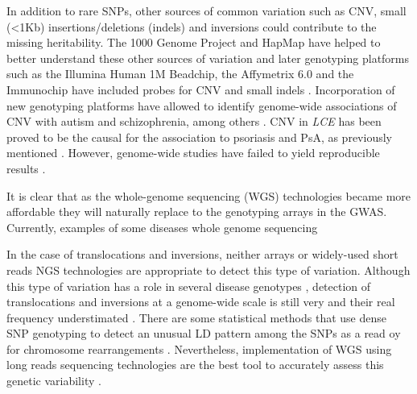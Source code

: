 In addition to rare SNPs, other sources of common variation such as CNV, small (<1Kb) insertions/deletions (indels) and inversions could contribute to the missing heritability. The 1000 Genome Project and HapMap have helped to better understand these other sources of variation and later genotyping platforms such as the Illumina Human 1M Beadchip, the Affymetrix 6.0 and the Immunochip have included probes for CNV and small indels \parencite{Ku2010}. Incorporation of new genotyping platforms have allowed to identify genome-wide associations of CNV with autism and schizophrenia, among others \parencite{Glessner2009,Marshall2017}. CNV in \textit{LCE} has been proved to be the causal for the association to psoriasis and PsA, as previously mentioned \parencite{Cid2009}. However, genome-wide studies have failed to yield reproducible results \parencite{Uebe2017}.


It is clear that as the whole-genome sequencing (WGS) technologies became more affordable they will naturally replace to the genotyping arrays in the GWAS. Currently, examples of some diseases whole genome sequencing

In the case of translocations and inversions, neither arrays or widely-used short reads NGS technologies are appropriate to detect this type of variation. Although this type of variation has a role in several disease genotypes \parencite{Feuk2010}, detection of  translocations and inversions at a genome-wide scale is still very and their real frequency understimated \parencite{Ku2010}. There are some statistical methods that use dense SNP genotyping to detect an unusual LD pattern among the SNPs as a read oy for chromosome rearrangements \parencite{Bansal2007}. Nevertheless, implementation of WGS using long reads sequencing technologies are the best tool to accurately assess this genetic variability \parencite{Visscher2017}. 




	

	


